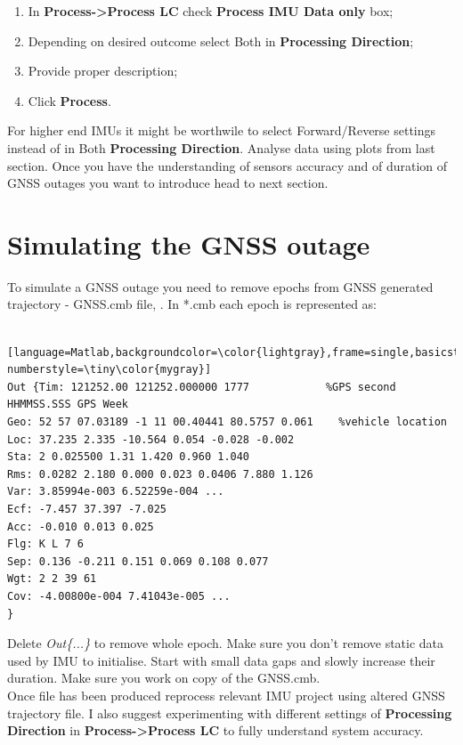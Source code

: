 \documentclass[british]{book}
\renewcommand{\footnotesize}{\scriptsize} %
\begin{document}
\begin{enumerate}
	\item In \textbf{Process->Process LC} check \textbf{Process IMU Data only} box;
	\item Depending on desired outcome select Both in \textbf{Processing Direction};
	\item Provide proper description;
	\item Click \textbf{Process}.
\end{enumerate}

For higher end IMUs it might be worthwile to select Forward/Reverse settings instead of in Both \textbf{Processing Direction}. Analyse data using plots from last section. Once you have the understanding of sensors accuracy and of duration of GNSS outages you want to introduce head to next section.


\chapter{Simulating the GNSS outage\label{sec:Simulating-GNSS-outage}}

To simulate a GNSS outage you need to remove epochs from GNSS generated trajectory - GNSS.cmb file, . In {*}.cmb each epoch is represented as:

\begin{lstlisting} [language=Matlab,backgroundcolor=\color{lightgray},frame=single,basicstyle=\footnotesize,numbers=left,numbersep=5pt, numberstyle=\tiny\color{mygray}]
Out {Tim: 121252.00 121252.000000 1777 			  %GPS second HHMMSS.SSS GPS Week
Geo: 52 57 07.03189 -1 11 00.40441 80.5757 0.061 	%vehicle location
Loc: 37.235 2.335 -10.564 0.054 -0.028 -0.002 	
Sta: 2 0.025500 1.31 1.420 0.960 1.040 	
Rms: 0.0282 2.180 0.000 0.023 0.0406 7.880 1.126 	
Var: 3.85994e-003 6.52259e-004 ...	
Ecf: -7.457 37.397 -7.025 	
Acc: -0.010 0.013 0.025 	
Flg: K L 7 6 	
Sep: 0.136 -0.211 0.151 0.069 0.108 0.077 	
Wgt: 2 2 39 61 	
Cov: -4.00800e-004 7.41043e-005 ...
}
\end{lstlisting}

Delete \emph{Out\{...\}} to remove whole epoch. Make sure you don't remove static data used by IMU to initialise. Start with small data gaps and slowly increase their duration. Make sure you work on copy of the GNSS.cmb.\\

Once file has been produced reprocess relevant IMU project using altered GNSS trajectory file. I also suggest experimenting with different settings of \textbf{Processing Direction} in \textbf{Process->Process LC} to fully understand system accuracy.
\end{document}
